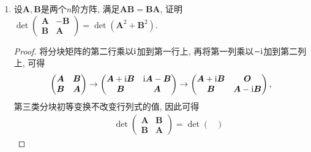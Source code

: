 \begin{3b}
\begin{enumerate}
\textbf{提示: }存在正交矩阵\(\boldsymbol{P}\)和\(0\leqslant m\leqslant n\)使得\(\boldsymbol{P(A+B)P}^{\rm T}=\begin{pmatrix}
        \boldsymbol{O}&\boldsymbol{O}\\\boldsymbol{O}&\boldsymbol{\varLambda}
\end{pmatrix}\), 其中\(\boldsymbol{\varLambda}\)是\(m\)阶正交矩阵. 
此时必有\(\boldsymbol{PAP}^{\rm T}=\begin{pmatrix}
\boldsymbol{O}&\boldsymbol{O}\\\boldsymbol{O}&\widetilde{\boldsymbol{A}}
\end{pmatrix},\boldsymbol{PBP}^{\rm T}=\begin{pmatrix}
\boldsymbol{O}&\boldsymbol{O}\\\boldsymbol{O}&\widetilde{\boldsymbol{B}}
\end{pmatrix}\), 其中\(\widetilde{\boldsymbol{A}},\widetilde{\boldsymbol{B}}\)都是\(m\)阶半正定矩阵.
\item 设\(\boldsymbol{A,B}\)是两个\(n\)阶方阵, 满足\(\boldsymbol{AB=BA}\), 
证明\(\det\begin{pmatrix}
    \boldsymbol{A}&\boldsymbol{-B}\\\boldsymbol{B}&\boldsymbol{A}
\end{pmatrix}=\det(\boldsymbol{A}^2+\boldsymbol{B}^2)\).
\begin{proof}
将分块矩阵的第二行乘以\({\rm i}\)加到第一行上, 再将第一列乘以\(-{\rm i}\)加到第二列上, 可得
\[\begin{pmatrix}
\boldsymbol{A}&\boldsymbol{B}\\\boldsymbol{B}&\boldsymbol{A}
\end{pmatrix}\rightarrow\begin{pmatrix}
\boldsymbol{A}+{\rm i}\boldsymbol{B}&{\rm i}\boldsymbol{A}-\boldsymbol{B}\\
\boldsymbol{B}&\boldsymbol{A}
\end{pmatrix}\rightarrow \begin{pmatrix}
\boldsymbol{A}+{\rm i}\boldsymbol{B}&\boldsymbol{O}\\
\boldsymbol{B}&\boldsymbol{A}-{\rm i}\boldsymbol{B}
\end{pmatrix},\]第三类分块初等变换不改变行列式的值, 因此可得
\[\begin{split}&\quad\det\begin{pmatrix}
\boldsymbol{A}&\boldsymbol{B}\\\boldsymbol{B}&\boldsymbol{A}
\end{pmatrix}=\det\begin{pmatrix}

\end{pmatrix}
\end{split}\]
\end{proof}
\end{enumerate}
\end{3b}

